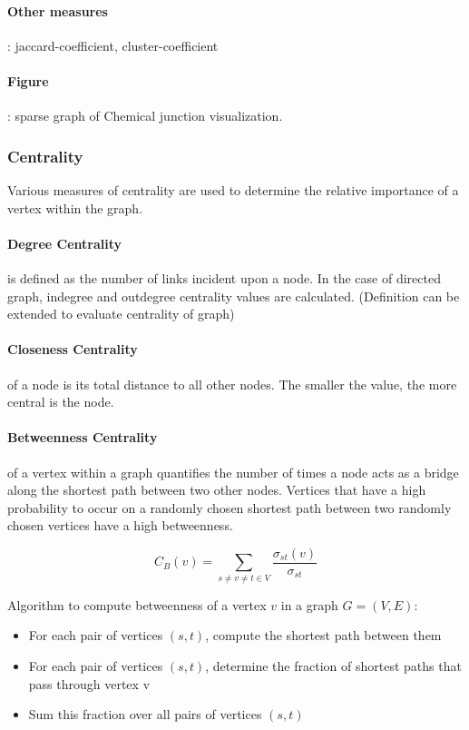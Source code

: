 \paragraph{Other measures}: \Gls{jaccard-coefficient}, \Gls{cluster-coefficient}

\paragraph{Figure} : sparse graph of Chemical junction visualization.

\subsubsection{Centrality}

Various measures of centrality are used to determine the relative importance of a vertex within the graph.

\paragraph{Degree Centrality} is defined as the number of links incident upon a node. In the case of directed graph, indegree and outdegree centrality values are
calculated. (Definition can be extended to evaluate centrality of graph)

\paragraph{Closeness Centrality} of a node is its total distance to all other nodes. The smaller the value, the more central is the node.

\paragraph{Betweenness Centrality} of a vertex within a graph quantifies the number of times a node acts as a bridge along the shortest path between two other nodes.
Vertices that have a high probability to occur on a randomly chosen shortest path between two randomly chosen vertices have a high betweenness.

$$ C_B(v) = \sum_{s \neq v \neq t \in V} \frac{\sigma_{st} (v)}{\sigma_{st}} $$

Algorithm to compute betweenness of a vertex $v$ in a graph $ G = (V, E) $:
\begin{itemize}
  \item For each pair of vertices $ (s, t) $, compute the shortest path between them
  \item For each pair of vertices $ (s, t) $, determine the fraction of shortest paths that pass through vertex v
  \item Sum this fraction over all pairs of vertices $ (s, t) $
\end{itemize}

